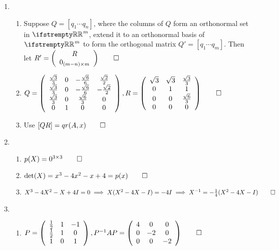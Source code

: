 \documentclass[12pt, a4paper]{article}
\begin{document}
\begin{enumerate}[Q\arabic*.]
  \item 
    \begin{enumerate}[(\alph*)]
    \item Suppose $Q = [q_1 \cdots q_n]$, where the columns of $Q$ form an orthonormal set in $\RR^m$, extend it to an orthonormal basis of $\RR^m$ to form the orthogonal matrix $Q' = [q_1 \cdots q_m]$. Then let $R' = \left(\begin{array}{c} R\\ 0_{(m-n)\times m} \end{array}\right) \qed$

    \item $Q = \left(\begin{array}{cccc} \frac{\sqrt{3}}{3} & 0 & -\frac{\sqrt{6}}{6} & \frac{\sqrt{2}}{2}\\ \frac{\sqrt{3}}{3} & 0 & -\frac{\sqrt{6}}{6} & -\frac{\sqrt{2}}{2}\\ \frac{\sqrt{3}}{3} & 0 & \frac{\sqrt{6}}{3} & 0\\ 0 & 1 & 0 & 0 \end{array}\right), R = \left(\begin{array}{ccc} \sqrt{3} & \sqrt{3} & \frac{\sqrt{3}}{3}\\ 0 & 1 & 1\\ 0 & 0 & \frac{\sqrt{6}}{3}\\ 0 & 0 & 0 \end{array}\right) \qed$

    \item Use $[Q R] = qr(A, x) \qed$
    \end{enumerate}

  \item 
    \begin{enumerate}[(\alph*)]
      \item $p(X) = 0^{3\times 3} \qed$

      \item $\det(X) = x^3 - 4x^2 - x + 4 = p(x) \qed$

      \item $X^3 -4X^2 -X + 4I = 0 \implies X(X^2-4X-I) = -4I \implies X^{-1} = -\frac{1}{4}(X^2-4X-I) \qed$
    \end{enumerate}

  \item 
    \begin{enumerate}[(\alph*)]
      \item $P = \left(\begin{array}{ccc} \frac{1}{2} & 1 & -1\\ \frac{1}{2} & 1 & 0\\ 1 & 0 & 1 \end{array}\right), P^{-1}AP = \left(\begin{array}{ccc} 4 & 0 & 0\\ 0 & -2 & 0\\ 0 & 0 & -2 \end{array}\right) \qed$


\end{enumerate}
\end{enumerate}
\end{document}
